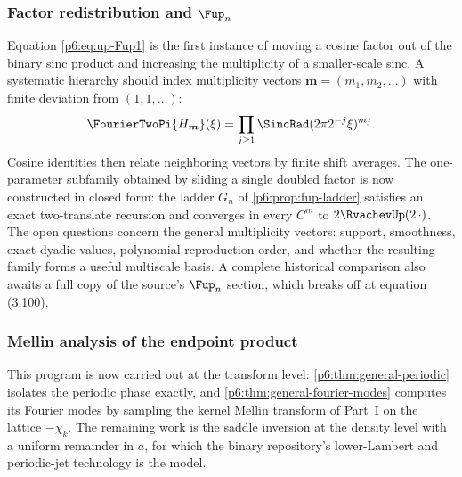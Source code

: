 \documentclass[11pt,oneside]{article}
\numberwithin{equation}{section}
\theoremstyle{definition}
\theoremstyle{remark}
\begin{document}
\subsubsection{Factor redistribution and \texorpdfstring{$\Fup_n$}{Fup-n}}
Equation \eqref{p6:eq:up-Fup1} is the first instance of moving a cosine factor out
of the binary sinc product and increasing the multiplicity of a smaller-scale
sinc.  A systematic hierarchy should index multiplicity vectors
$\boldsymbol m=(m_1,m_2,\ldots)$ with finite deviation from $(1,1,\ldots)$:
\[
 \FourierTwoPi{H_{\boldsymbol m}}(\xi)
 =\prod_{j\ge1}\SincRad(2\pi2^{-j}\xi)^{m_j}.
\]
Cosine identities then relate neighboring vectors by finite shift averages.
The one-parameter subfamily obtained by sliding a single doubled factor is now
constructed in closed form: the ladder $G_n$ of \cref{p6:prop:fup-ladder}
satisfies an exact two-translate recursion and converges in every $C^m$ to
$2\RvachevUp(2\,\cdot)$.  The open questions concern the general multiplicity
vectors: support, smoothness, exact dyadic values, polynomial reproduction
order, and whether the resulting family forms a useful multiscale basis.
A complete historical comparison also awaits a full copy of the source's
$\Fup_n$ section, which breaks off at equation (3.100).

\subsubsection{Mellin analysis of the endpoint product}
This program is now carried out at the transform level:
\cref{p6:thm:general-periodic} isolates the periodic phase exactly, and
\cref{p6:thm:general-fourier-modes} computes its Fourier modes by sampling the
kernel Mellin transform of Part~I on the lattice $-\chi_k$.  The remaining
work is the saddle inversion at the density level with a uniform remainder in
$a$, for which the binary repository's lower-Lambert and periodic-jet
technology is the model.
\end{document}
